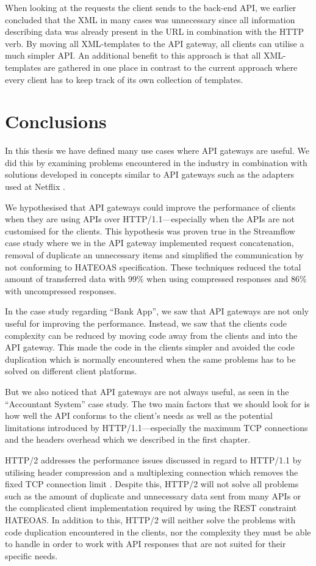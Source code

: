 \documentclass{cslthse-msc}
\begin{document}
When looking at the requests the client sends to the back-end API, we earlier concluded that the XML in many cases was unnecessary since all information describing data was already present in the URL in combination with the HTTP verb. By moving all XML-templates to the API gateway, all clients can utilise a much simpler API. An additional benefit to this approach is that all XML-templates are gathered in one place in contrast to the current approach where every client has to keep track of its own collection of templates.

\chapter{Conclusions}
In this thesis we have defined many use cases where API gateways are useful. We did this by examining problems encountered in the industry in combination with solutions developed in concepts similar to API gateways such as the adapters used at Netflix \cite{netflix}.

We hypothesised that API gateways could improve the performance of clients when they are using APIs over HTTP/1.1---especially when the APIs are not customised for the clients. This hypothesis was proven true in the Streamflow case study where we in the API gateway implemented request concatenation, removal of duplicate an unnecessary items and simplified the communication by not conforming to HATEOAS specification. These techniques reduced the total amount of transferred data with 99\% when using compressed responses and 86\% with uncompressed responses. 

In the case study regarding \enquote{Bank App}, we saw that API gateways are not only useful for improving the performance. Instead, we saw that the clients code complexity can be reduced by moving code away from the clients and into the API gateway. This made the code in the clients simpler and avoided the code duplication which is normally encountered when the same problems has to be solved on different client platforms.

But we also noticed that API gateways are not always useful, as seen in the \enquote{Accountant System} case study. The two main factors that we should look for is how well the API conforms to the client's needs as well as the potential limitations introduced by HTTP/1.1---especially the maximum TCP connections and the headers overhead which we described in the first chapter.

HTTP/2 addresses the performance issues discussed in regard to HTTP/1.1 by utilising header compression and a multiplexing connection which removes the fixed TCP connection limit \cite{hpbn2}. Despite this, HTTP/2 will not solve all problems such as the amount of duplicate and unnecessary data sent from many APIs or the complicated client implementation required by using the REST constraint HATEOAS. In addition to this, HTTP/2 will neither solve the problems with code duplication encountered in the clients, nor the complexity they must be able to handle in order to work with API responses that are not suited for their specific needs.
\end{document}
